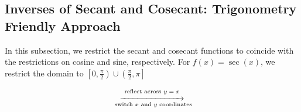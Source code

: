 \documentclass[12pt]{ximera}
\begin{document}
\subsection{Inverses of Secant and Cosecant: Trigonometry Friendly Approach}

In this subsection, we restrict the secant and cosecant functions to coincide with the restrictions on cosine and sine, respectively.  For $f(x) = \sec(x)$, we restrict the domain to $\left[0, \frac{\pi}{2}\right) \cup \left( \frac{\pi}{2}, \pi\right]$ 


 \[ \begin{array}{ccc}



&

\stackrel{\stackrel{\mbox{\scriptsize reflect across $y=x$}}{\xrightarrow{\hspace{1in}}}}{\mbox{ \scriptsize switch $x$ and $y$ coordinates}} 

&



\end{array}\]
\end{document}
